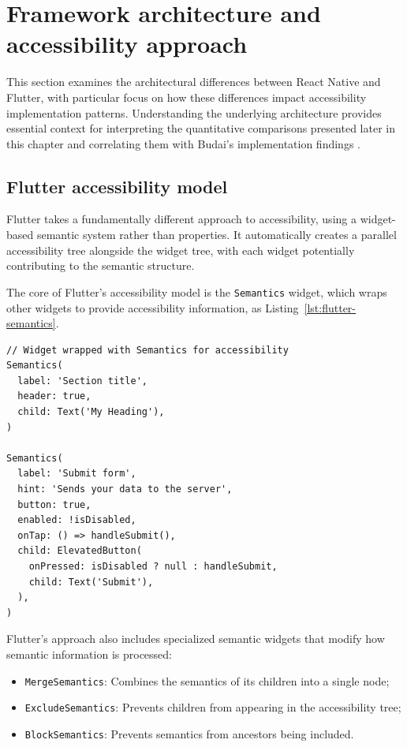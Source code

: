 \section{Framework architecture and accessibility approach}
\label{sec:framework-architecture}

This section examines the architectural differences between React Native and Flutter, with particular focus on how these differences impact accessibility implementation patterns. Understanding the underlying architecture provides essential context for interpreting the quantitative comparisons presented later in this chapter and correlating them with Budai's implementation findings \cite{budai2024mobile}.

\subsection{Flutter accessibility model}
Flutter takes a fundamentally different approach to accessibility, using a widget-based semantic system rather than properties. It automatically creates a parallel accessibility tree alongside the widget tree, with each widget potentially contributing to the semantic structure.

The core of Flutter's accessibility model is the \texttt{Semantics} widget, which wraps other widgets to provide accessibility information, as Listing~\ref{lst:flutter-semantics}.

\begin{lstlisting}[style=DartStyle, caption=Flutter Semantics widget system, label=lst:flutter-semantics]
// Widget wrapped with Semantics for accessibility
Semantics(
  label: 'Section title',
  header: true,
  child: Text('My Heading'),
)

Semantics(
  label: 'Submit form',
  hint: 'Sends your data to the server',
  button: true,
  enabled: !isDisabled,
  onTap: () => handleSubmit(),
  child: ElevatedButton(
    onPressed: isDisabled ? null : handleSubmit,
    child: Text('Submit'),
  ),
)
\end{lstlisting}

Flutter's approach also includes specialized semantic widgets that modify how semantic information is processed:

\begin{itemize}
    \item \texttt{MergeSemantics}: Combines the semantics of its children into a single node;
    \item \texttt{ExcludeSemantics}: Prevents children from appearing in the accessibility tree;
    \item \texttt{BlockSemantics}: Prevents semantics from ancestors being included.
\end{itemize}

